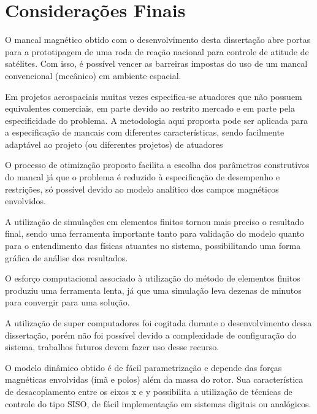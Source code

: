 \pagestyle{empty}
	\cleardoublepage
\pagestyle{fancy}

\chapter{Considerações Finais} \label{Cap:Consideracoes:Finais}

O mancal magnético obtido com o desenvolvimento desta dissertação abre portas para a prototipagem de uma roda de reação nacional para controle de atitude de satélites. Com isso, é possível vencer as barreiras impostas do uso de um mancal convencional (mecânico) em ambiente espacial.

Em projetos aerospaciais muitas vezes especifica-se atuadores que não possuem equivalentes comerciais, em parte devido ao restrito mercado e em parte pela especificidade do problema. A metodologia aqui proposta pode ser aplicada para a especificação de mancais com diferentes características, sendo facilmente adaptável ao projeto (ou diferentes projetos) de atuadores


O processo de otimização proposto facilita a escolha dos parâmetros construtivos do mancal já que o problema é reduzido à especificação de desempenho e restrições, só possível devido ao modelo analítico dos campos magnéticos envolvidos.

A utilização de simulações em elementos finitos tornou mais preciso o resultado final, sendo uma ferramenta importante tanto para validação do modelo quanto para o entendimento das físicas atuantes no sistema, possibilitando uma forma gráfica de análise dos resultados. 

O esforço computacional associado à utilização do método de elementos finitos produziu uma ferramenta lenta, já que uma simulação leva dezenas de minutos para convergir para uma solução.

A utilização de super computadores foi cogitada durante o desenvolvimento dessa dissertação, porém não foi possível devido a complexidade de configuração do sistema, trabalhos futuros devem fazer uso desse recurso.

O modelo dinâmico obtido é de fácil parametrização e depende das forças magnéticas envolvidas (ímã e polos) além da massa do rotor. Sua característica de desacoplamento entre os eixos x e y possibilita a utilização de técnicas de controle do tipo SISO, de fácil implementação em sistemas digitais ou analógicos.

